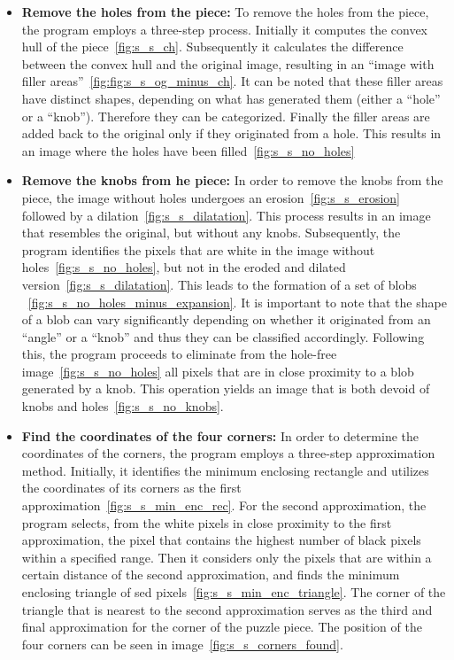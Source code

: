 \documentclass[epsfig,a4paper,11pt,titlepage,twoside,openany]{article}
\begin{document}
\begin{itemize}

  \item \textbf{Remove the holes from the piece:}\newline
  To remove the holes from the piece, the program employs a three-step process. Initially it
  computes the convex hull of the piece~\cref{fig:s_s_ch}.
  Subsequently it calculates the difference between the convex hull and the original image,
  resulting in an ``image with filler areas''~\cref{fig:fig:s_s_og_minus_ch}.
  It can be noted that these filler areas have distinct shapes,
  depending on what has generated them (either a ``hole'' or a ``knob'').
  Therefore they can be categorized.
  Finally the filler areas are added back to the original only if
  they originated from a hole. This results in an image where the holes
  have been filled~\cref{fig:s_s_no_holes}

  \item \textbf{Remove the knobs from he piece:}\newline
  In order to remove the knobs from the piece, the image without holes
  undergoes an erosion~\cref{fig:s_s_erosion} followed by a dilation~\cref{fig:s_s_dilatation}.
  This process results in an image that resembles the original, but without any knobs.
  Subsequently, the program identifies the pixels that are white in the image without holes~\cref{fig:s_s_no_holes},
  but not in the eroded and dilated version~\cref{fig:s_s_dilatation}.
  This leads to the formation of a set of blobs ~\cref{fig:s_s_no_holes_minus_expansion}.
  It is important to note that the shape of a blob can vary significantly depending on whether it originated
  from an ``angle'' or a ``knob'' and thus they can be classified accordingly.
  Following this, the program proceeds to eliminate from the hole-free
  image~\cref{fig:s_s_no_holes} all pixels that are in close proximity to a blob generated by a knob.
  This operation yields an image that is both devoid of knobs and holes~\cref{fig:s_s_no_knobs}.
  
  \item \textbf{Find the coordinates of the four corners:}\newline
  In order to determine the coordinates of the corners,
  the program employs a three-step approximation method.
  Initially, it identifies the minimum enclosing rectangle and
  utilizes the coordinates of its corners
  as the first approximation~\cref{fig:s_s_min_enc_rec}.\newline
  For the second approximation, the program selects,
  from the white pixels in close proximity to the first approximation,
  the pixel that contains the highest number of black pixels
  within a specified range.
  Then it considers only the pixels that are within a certain
  distance of the second approximation, and finds the minimum
  enclosing triangle of sed pixels~\cref{fig:s_s_min_enc_triangle}.\newline
  The corner of the triangle that is nearest to the second
  approximation serves as the third and final approximation
  for the corner of the puzzle piece.
  The position of the four corners can be seen in image~\cref{fig:s_s_corners_found}.


\end{itemize}
\end{document}
